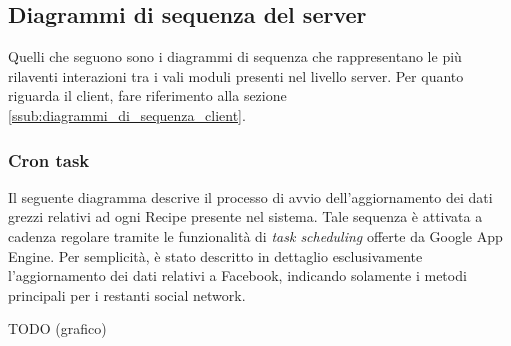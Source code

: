 %


\subsection{Diagrammi di sequenza del server} %
\label{ssub:diagrammi_di_sequenza_server}
Quelli che seguono sono i diagrammi di sequenza che rappresentano le più rilaventi interazioni tra i vali moduli presenti nel livello server. Per quanto riguarda il client, fare riferimento alla sezione \ref{ssub:diagrammi_di_sequenza_client}.

    \subsubsection{Cron task} %
    \label{ssub:cron_task}
    Il seguente diagramma descrive il processo di avvio dell'aggiornamento dei dati grezzi relativi ad ogni Recipe presente nel sistema. Tale sequenza è attivata a cadenza regolare tramite le funzionalità di \textit{task scheduling} offerte da Google App Engine. Per semplicità, è stato descritto in dettaglio esclusivamente l'aggiornamento dei dati relativi a Facebook, indicando solamente i metodi principali per i restanti social network. \newline

    TODO (grafico) \newline
    \noindent


